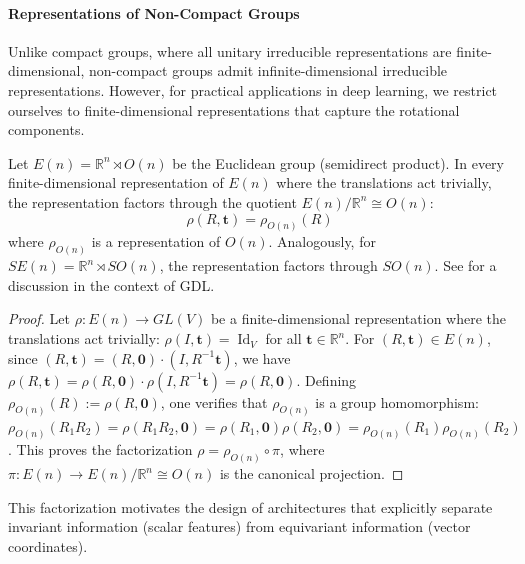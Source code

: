 \paragraph{Representations of Non-Compact Groups}

Unlike compact groups, where all unitary irreducible representations are finite-dimensional, non-compact groups admit infinite-dimensional irreducible representations. However, for practical applications in deep learning, we restrict ourselves to finite-dimensional representations that capture the rotational components.

\begin{proposition}\label{prop:descomp_repr_en}
Let $E(n) = \mathbb{R}^n \rtimes O(n)$ be the Euclidean group (semidirect product). In every finite-dimensional representation of $E(n)$ where the translations act trivially, the representation factors through the quotient $E(n)/\mathbb{R}^n \cong O(n)$:
\begin{equation}
\rho(R, \mathbf{t}) = \rho_{O(n)}(R)
\end{equation}
where $\rho_{O(n)}$ is a representation of $O(n)$. Analogously, for $SE(n) = \mathbb{R}^n \rtimes SO(n)$, the representation factors through $SO(n)$. See \citep{DBLP:journals/corr/abs-2104-13478} for a discussion in the context of GDL.
\end{proposition}

\begin{proof}
Let $\rho: E(n) \to GL(V)$ be a finite-dimensional representation where the translations act trivially: $\rho(I, \mathbf{t}) = \operatorname{Id}_V$ for all $\mathbf{t} \in \mathbb{R}^n$. For $(R, \mathbf{t}) \in E(n)$, since $(R, \mathbf{t}) = (R, \mathbf{0}) \cdot (I, R^{-1}\mathbf{t})$, we have $\rho(R, \mathbf{t}) = \rho(R, \mathbf{0}) \cdot \rho(I, R^{-1}\mathbf{t}) = \rho(R, \mathbf{0})$. Defining $\rho_{O(n)}(R) := \rho(R, \mathbf{0})$, one verifies that $\rho_{O(n)}$ is a group homomorphism: $\rho_{O(n)}(R_1 R_2) = \rho(R_1 R_2, \mathbf{0}) = \rho(R_1, \mathbf{0}) \rho(R_2, \mathbf{0}) = \rho_{O(n)}(R_1) \rho_{O(n)}(R_2)$. This proves the factorization $\rho = \rho_{O(n)} \circ \pi$, where $\pi: E(n) \to E(n)/\mathbb{R}^n \cong O(n)$ is the canonical projection.
\end{proof}

This factorization motivates the design of architectures that explicitly separate invariant information (scalar features) from equivariant information (vector coordinates).

